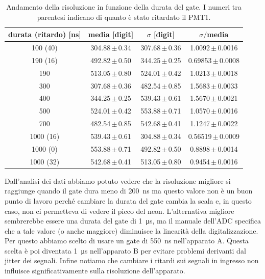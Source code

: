\begin{table}[h]
\centering
\begin{tabular}{c|c|c|c}
durata (ritardo) [ns] & media [digit] & $\sigma$ [digit] & $\sigma\!/$\!media\\
\hline
 100 (40) & 304.88\,$\pm$\,0.34 & 307.68\,$\pm$\,0.36 &  1.0092\,$\pm$\,0.0016 \\
 190 (16) & 492.82\,$\pm$\,0.50 & 344.25\,$\pm$\,0.25 & 0.69853\,$\pm$\,0.0008 \\
 190 & 513.05\,$\pm$\,0.80 & 524.01\,$\pm$\,0.42 &  1.0213\,$\pm$\,0.0018 \\
 300 & 307.68\,$\pm$\,0.36 & 482.54\,$\pm$\,0.85 &  1.5683\,$\pm$\,0.0033 \\
 400 & 344.25\,$\pm$\,0.25 & 539.43\,$\pm$\,0.61 &  1.5670\,$\pm$\,0.0021 \\
 500 & 524.01\,$\pm$\,0.42 & 553.88\,$\pm$\,0.71 &  1.0570\,$\pm$\,0.0016 \\
 700 & 482.54\,$\pm$\,0.85 & 542.68\,$\pm$\,0.41 &  1.1247\,$\pm$\,0.0022 \\
1000 (16) & 539.43\,$\pm$\,0.61 & 304.88\,$\pm$\,0.34 & 0.56519\,$\pm$\,0.0009 \\
1000 (0) & 553.88\,$\pm$\,0.71 & 492.82\,$\pm$\,0.50 &  0.8898\,$\pm$\,0.0014 \\
1000 (32) & 542.68\,$\pm$\,0.41 & 513.05\,$\pm$\,0.80 &  0.9454\,$\pm$\,0.0016 
\end{tabular}

\caption{Andamento della risoluzione in funzione della durata del gate. I numeri tra parentesi indicano di quanto è stato ritardato il PMT1.}
\label{tab:gate}
\end{table}

Dall'analisi dei dati abbiamo potuto vedere che la risoluzione migliore si raggiunge quando il gate dura meno di \SI{200}{ns}
ma questo valore non è un buon punto di lavoro perché cambiare la durata del gate cambia la scala e, in questo caso, non ci permetteva di vedere il picco del neon.
L'alternativa migliore sembrerebbe essere una durata del gate di \SI{1}{\micro s}, ma il manuale dell'ADC specifica che a tale valore (o anche maggiore) diminuisce la linearità della digitalizzazione. Per questo abbiamo scelto di usare un gate di \SI{550}{ns} nell'apparato A.
Questa scelta è poi diventata \SI{1}{\micro s} nell'apparato B per evitare problemi derivanti dal jitter dei segnali. Infine notiamo che cambiare i ritardi sui segnali in ingresso non influisce significativamente sulla risoluzione dell'apparato.
